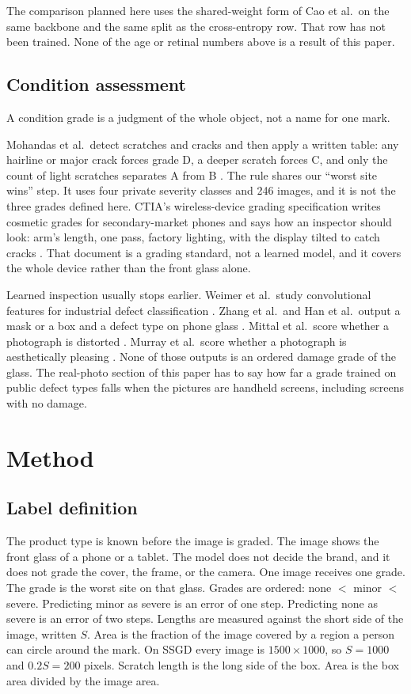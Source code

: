 \documentclass[10pt]{article}
\begin{document}
The comparison planned here uses the shared-weight form of Cao et al.\ on the same backbone and the same split as the cross-entropy row. That row has not been trained. None of the age or retinal numbers above is a result of this paper.

\subsection{Condition assessment}
A condition grade is a judgment of the whole object, not a name for one mark.

Mohandas et al.\ detect scratches and cracks and then apply a written table: any hairline or major crack forces grade D, a deeper scratch forces C, and only the count of light scratches separates A from B \cite{mohandas2025grading}. The rule shares our ``worst site wins'' step. It uses four private severity classes and 246 images, and it is not the three grades defined here. CTIA's wireless-device grading specification writes cosmetic grades for secondary-market phones and says how an inspector should look: arm's length, one pass, factory lighting, with the display tilted to catch cracks \cite{ctia2026grading}. That document is a grading standard, not a learned model, and it covers the whole device rather than the front glass alone.

Learned inspection usually stops earlier. Weimer et al.\ study convolutional features for industrial defect classification \cite{weimer2016inspection}. Zhang et al.\ and Han et al.\ output a mask or a box and a defect type on phone glass \cite{zhang2022fdsnet,han2023ssgd}. Mittal et al.\ score whether a photograph is distorted \cite{mittal2012brisque}. Murray et al.\ score whether a photograph is aesthetically pleasing \cite{murray2012ava}. None of those outputs is an ordered damage grade of the glass. The real-photo section of this paper has to say how far a grade trained on public defect types falls when the pictures are handheld screens, including screens with no damage.

\section{Method}
\subsection{Label definition}
The product type is known before the image is graded. The image shows the front glass of a phone or a tablet. The model does not decide the brand, and it does not grade the cover, the frame, or the camera. One image receives one grade. The grade is the worst site on that glass. Grades are ordered: none $<$ minor $<$ severe. Predicting minor as severe is an error of one step. Predicting none as severe is an error of two steps. Lengths are measured against the short side of the image, written $S$. Area is the fraction of the image covered by a region a person can circle around the mark. On SSGD every image is $1500\times 1000$, so $S=1000$ and $0.2S=200$ pixels. Scratch length is the long side of the box. Area is the box area divided by the image area.
\end{document}
